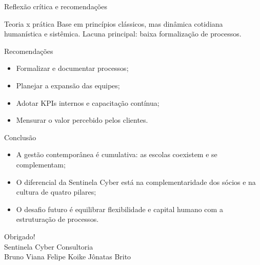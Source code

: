 \documentclass[aspectratio=169,12pt]{beamer}
\begin{document}
\begin{frame}{Reflexão crítica e recomendações}
  \begin{block}{Teoria x prática}
    Base em princípios clássicos, mas dinâmica cotidiana humanística e
    sistêmica. Lacuna principal: baixa formalização de processos.
  \end{block}
  \begin{block}{Recomendações}
    \begin{itemize}
      \item Formalizar e documentar processos;
      \item Planejar a expansão das equipes;
      \item Adotar KPIs internos e capacitação contínua;
      \item Mensurar o valor percebido pelos clientes.
    \end{itemize}
  \end{block}
\end{frame}

\begin{frame}{Conclusão}
  \begin{itemize}
    \item A gestão contemporânea é cumulativa: as escolas coexistem e se complementam;
    \item O diferencial da Sentinela Cyber está na complementaridade dos sócios e na cultura de quatro pilares;
    \item O desafio futuro é equilibrar flexibilidade e capital humano com a estruturação de processos.
  \end{itemize}
\end{frame}

\begin{frame}[plain]
  \centering
  \vfill
  {\Large Obrigado!}\\[0.4cm]
  {\normalsize Sentinela Cyber Consultoria}\\
  {\normalsize Bruno Viana \quad Felipe Koike \quad Jônatas Brito}
  \vfill
\end{frame}
\end{document}

